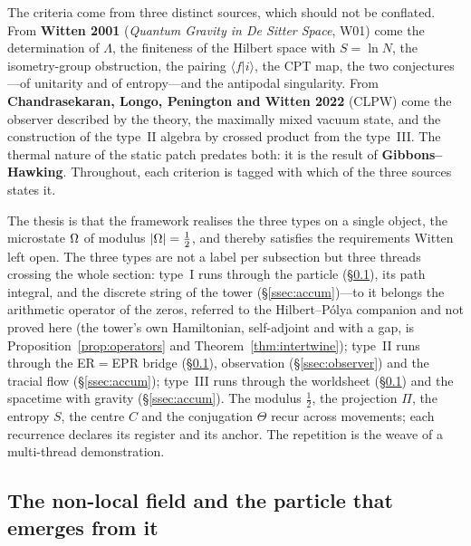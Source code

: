 The criteria come from three distinct sources, which should not be conflated. From
\textbf{Witten 2001} (\emph{Quantum Gravity in De Sitter Space}, W01) come the
determination of $\Lambda$, the finiteness of the Hilbert space with $S=\ln N$, the
isometry-group obstruction, the pairing $\langle f|i\rangle$, the CPT map, the two
conjectures---of unitarity and of entropy---and the antipodal singularity. From
\textbf{Chandrasekaran, Longo, Penington and Witten 2022} (CLPW) come the observer
described by the theory, the maximally mixed vacuum state, and the construction of the
type~II algebra by crossed product from the type~III. The thermal nature of the static
patch predates both: it is the result of \textbf{Gibbons--Hawking}. Throughout, each
criterion is tagged with which of the three sources states it.

The thesis is that the framework realises the three types on a single object, the
microstate $\Omega$ of modulus $|\Omega|=\tfrac12$, and thereby satisfies the requirements
Witten left open. The three types are not a label per subsection but three threads
crossing the whole section: type~I runs through the particle (\S\ref{ssec:hinge}), its
path integral, and the discrete string of the tower (\S\ref{ssec:accum})---to it belongs
the arithmetic operator of the zeros, referred to the Hilbert--P\'olya companion and not proved
here (the tower's own Hamiltonian, self-adjoint and with a gap, is
Proposition~\ref{prop:operators} and Theorem~\ref{thm:intertwine}); type~II runs
through the ER${=}$EPR bridge (\S\ref{ssec:hinge}), observation
(\S\ref{ssec:observer}) and the tracial flow (\S\ref{ssec:accum}); type~III runs through
the worldsheet (\S\ref{ssec:hinge}) and the spacetime with gravity (\S\ref{ssec:accum}).
The modulus $\tfrac12$, the projection $\Pi$, the entropy $S$, the centre $C$ and the
conjugation $\Theta$ recur across movements; each recurrence declares its register and
its anchor. The repetition is the weave of a multi-thread demonstration.


\subsection{The non-local field and the particle that emerges from it}\label{ssec:hinge}

